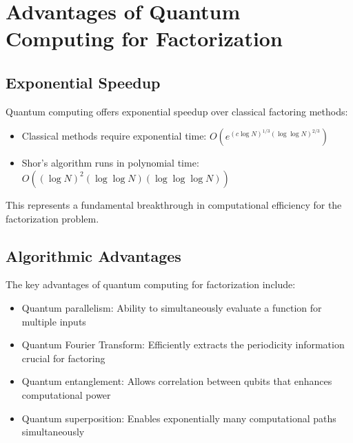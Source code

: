 \documentclass{article}
\begin{document}
\begin{table}[ht]
\centering
{}
\caption{Complexity comparison between classical and quantum factoring algorithms}
\end{table}

\section{Advantages of Quantum Computing for Factorization}
\subsection{Exponential Speedup}
Quantum computing offers exponential speedup over classical factoring methods:
\begin{itemize}
    \item Classical methods require exponential time: $O(e^{(c \log N)^{1/3} (\log \log N)^{2/3}})$
    \item Shor's algorithm runs in polynomial time: $O((\log N)^2 (\log \log N) (\log \log \log N))$
\end{itemize}

This represents a fundamental breakthrough in computational efficiency for the factorization problem.

\subsection{Algorithmic Advantages}
The key advantages of quantum computing for factorization include:
\begin{itemize}
    \item Quantum parallelism: Ability to simultaneously evaluate a function for multiple inputs
    \item Quantum Fourier Transform: Efficiently extracts the periodicity information crucial for factoring
    \item Quantum entanglement: Allows correlation between qubits that enhances computational power
    \item Quantum superposition: Enables exponentially many computational paths simultaneously
\end{itemize}
\end{document}
